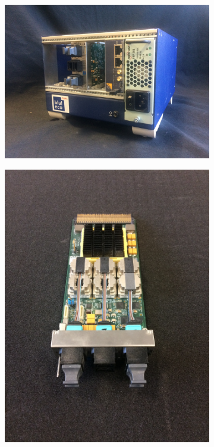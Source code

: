 \begin{figure}
\begin{subfigure}[t]{.35\textwidth}
\centering
\includegraphics[width=1\textwidth]{03_GraphicFiles/chapter3_CLaRySproto/Electronics_Acquisition/uTCAcrate_1.jpg}
\caption{}
\label{chap3::fig::uTCAcrate}
\end{subfigure}
\begin{subfigure}[t]{.28\textwidth}
\centering
\includegraphics[width=1\textwidth, angle = -90, trim={0 0.2cm 0 0.2cm}, clip = true]{03_GraphicFiles/chapter3_CLaRySproto/Electronics_Acquisition/AMC40_ipnl_top.jpg}

\end{subfigure}
\end{figure}
